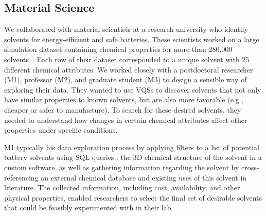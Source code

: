  \subsection{Material Science}
 \par\noindent{} 
 \npar We collaborated with material scientists at a research university who identify solvents for energy-efficient and safe batteries. These scientists worked on a large simulation dataset containing chemical properties for more than 280,000 solvents~\cite{Khetan2018}. Each row of their dataset corresponded to a unique solvent with 25 different chemical attributes. We worked closely with a postdoctoral researcher (M1), professor (M2), and graduate student (M3) to design a sensible way of exploring their data. They wanted to use VQSs to discover solvents that not only have similar properties to known solvents, but are also more favorable (e.g., cheaper or safer to manufacture). To search for these desired solvents, they needed to understand how changes in certain chemical attributes affect other properties under specific conditions.
 \par\noindent{} 
 \npar M1 typically  his data exploration process by applying filters to a list of potential battery solvents using SQL queries .  the 3D chemical structure of the solvent in a custom software, as well as gathering information regarding the solvent by cross-referencing an external chemical database and existing uses of this solvent in literature. The collected information, including cost, availability, and other physical properties, enabled researchers to select the final set of desirable solvents that could be feasibly experimented with in their lab.  %
